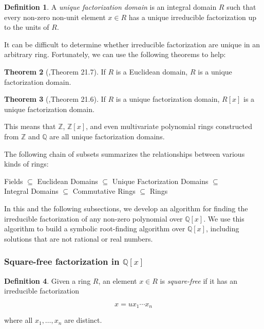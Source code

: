 \documentclass{article}
\theoremstyle{definition}
\newtheorem{thm}{Theorem}[section]
\newtheorem{defin}[thm]{Definition}
\begin{document}
    \begin{defin}
        A \emph{unique factorization domain} is an integral domain $R$ such that every non-zero non-unit element $x \in R$ has a unique irreducible factorization up to the units of $R$. 
    \end{defin}
    
    It can be difficult to determine whether irreducible factorization are unique in an arbitrary ring. Fortunately, we can use the following theorems to help:
    
    \begin{thm}[\cite{aa},Theorem 21.7]
        If $R$ is a Euclidean domain, $R$ is a unique factorization domain.
    \end{thm}
    
    \begin{thm}[\cite{aa},Theorem 21.6]
        If $R$ is a unique factorization domain, $R[x]$ is a unique factorization domain.
    \end{thm}
    
    This means that $\mathbb{Z}$, $\mathbb{Z}[x]$, and even multivariate polynomial rings constructed from $\mathbb{Z}$ and $\mathbb{Q}$ are all unique factorization domains.
    
    The following chain of subsets summarizes the relationships between various kinds of rings:
    \begin{center}
        Fields $\subseteq$ Euclidean Domains $\subseteq$ Unique Factorization Domains $\subseteq$ \\ Integral Domains $\subseteq$ Commutative Rings $\subseteq$ Rings
    \end{center}
    
    In this and the following subsections, we develop an algorithm for finding the irreducible factorization of any non-zero polynomial over $\mathbb{Q}[x]$. We use this algorithm to build a symbolic root-finding algorithm over $\mathbb{Q}[x]$, including solutions that are not rational or real numbers.
    
    
    \subsubsection{Square-free factorization in $\mathbb{Q}[x]$}
    
    \begin{defin}
        Given a ring $R$, an element $x \in R$ is \emph{square-free} if it has an irreducible factorization
        
        \begin{equation*}
            x = ux_1 \cdots x_n
        \end{equation*}
        
        where all $x_1, \ldots , x_n$ are distinct.
    \end{defin}
    
\end{document}
